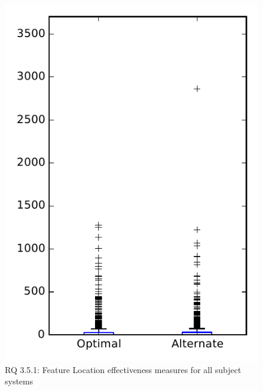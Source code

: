 
\begin{figure}
\centering
\includegraphics[height=0.4\textheight]{figures/combo/flt_rq1_overview}
\caption{RQ 3.5.1: Feature Location effectiveness measures for all subject systems}
\label{fig:flt:rq1:overview}
\end{figure}
